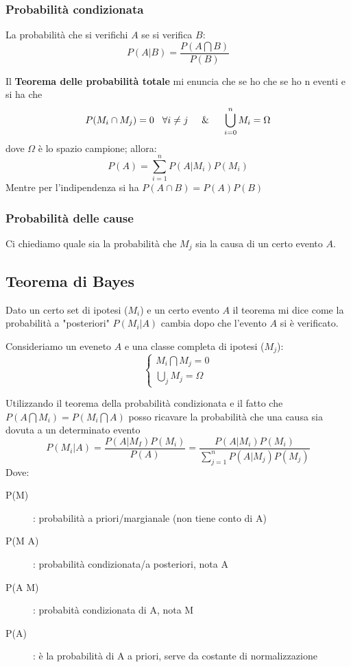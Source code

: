 \documentclass{article}
\theoremstyle{remark}
\begin{document}
\subsubsection{Probabilità condizionata}

La probabilità che si verifichi $A$ se si verifica $B$: 
\[
P(A|B)=\frac{P(A \bigcap B)}{P(B)}
\]

Il \textbf{Teorema delle probabilità totale} mi enuncia che se ho che se ho n eventi e si ha che 
\[ \displaystyle P(M_i \cap M_j)=0 \hspace{0.3cm}\forall i \neq j \hspace{0.5cm} \& \hspace{0.5cm} \bigcup_{i=0}^{n}M_i=\Omega \]
dove $\Omega$ è lo spazio campione; allora:
\[
P(A)=\sum_{i=1}^{n}P(A|M_i)P(M_i)
\]
Mentre per l'indipendenza si ha $P(A \cap B)=P(A)P(B)$

\subsubsection{Probabilità delle cause}
Ci chiediamo quale sia la probabilità che $M_j$ sia la causa di un certo evento $A$.


\subsection{Teorema di Bayes }
Dato un certo set di ipotesi ($M_i$) e un certo evento $A$ il teorema mi dice come la probabilità a "posteriori" $P(M_i|A)$ cambia dopo che l'evento $A$ si è verificato.

Consideriamo un eveneto $A$ e una classe completa di ipotesi ($M_j$):
\[
\begin{cases}
    M_i\bigcap M_j=0 \\
    \bigcup_j M_j=\Omega
\end{cases}
\]
 
Utilizzando il teorema della probabilità condizionata e il fatto che $P(A \bigcap M_i)=P(M_i \bigcap A)$ posso ricavare la probabilità che una causa sia dovuta a un determinato evento
\[
P(M_i|A)=\frac{P(A|M_I)P(M_i)}{P(A)}=\frac{P(A|M_i)P(M_i)}{\sum_{j=1}^{n}P(A|M_j)P(M_j)}
\]
Dove:
\begin{description}
    \item[P(M)]: probabilità a priori/margianale (non tiene conto di A)
    \item [P(M \textbar \space A)]: probabilità condizionata/a posteriori, nota A
    \item [P(A \textbar \space M)]: probabità condizionata di A, nota M
    \item [P(A)]: è la probabilità di A a priori, serve da costante di normalizzazione
\end{description}
\end{document}
